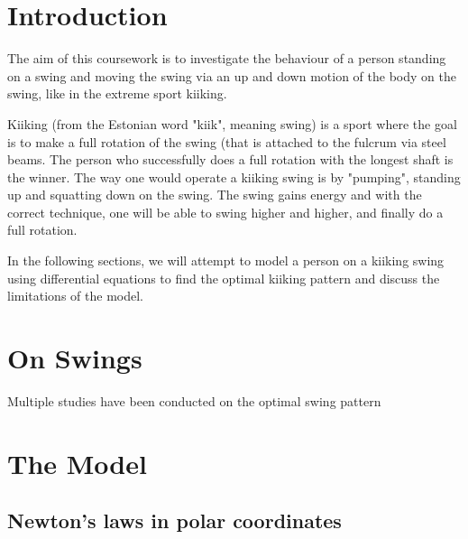 \documentclass[12pt]{article}
\begin{document}
\begin{abstract}
\end{abstract}

\newpage

\section{Introduction}
The aim of this coursework is to investigate the behaviour of a person standing on a swing and moving the swing via an up and down motion of the body on the swing, like in the extreme sport kiiking.

Kiiking (from the Estonian word "kiik", meaning swing) is a sport where the goal is to make a full rotation of the swing (that is attached to the fulcrum via steel beams. The person who successfully does a full rotation with the longest shaft is the winner. The way one would operate a kiiking swing is by "pumping", standing up and squatting down on the swing. The swing gains energy and with the correct technique, one will be able to swing higher and higher, and finally do a full rotation.

In the following sections, we will attempt to model a person on a kiiking swing using differential equations to find the optimal kiiking pattern and discuss the limitations of the model. %

\section{On Swings}
Multiple studies have been conducted on the optimal swing pattern \cite{wirkus1998pump, klimina2022optimal, Yan2005swing}


\section{The Model}
\subsection{Newton's laws in polar coordinates}
\end{document}
